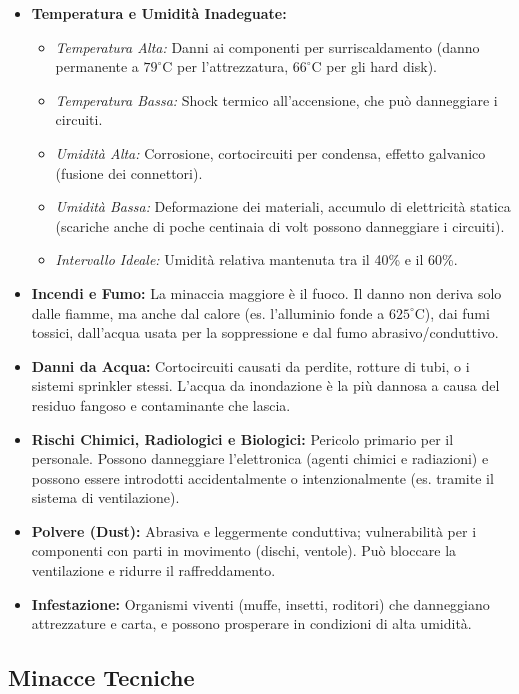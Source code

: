 \begin{itemize}
    \item \textbf{Temperatura e Umidità Inadeguate:}
    \begin{itemize}
        \item \textit{Temperatura Alta:} Danni ai componenti per surriscaldamento (danno permanente a $79^\circ$C per l'attrezzatura, $66^\circ$C per gli hard disk).
        \item \textit{Temperatura Bassa:} Shock termico all'accensione, che può danneggiare i circuiti.
        \item \textit{Umidità Alta:} Corrosione, cortocircuiti per condensa, effetto galvanico (fusione dei connettori).
        \item \textit{Umidità Bassa:} Deformazione dei materiali, accumulo di elettricità statica (scariche anche di poche centinaia di volt possono danneggiare i circuiti).
        \item \textit{Intervallo Ideale:} Umidità relativa mantenuta tra il 40\% e il 60\%.
    \end{itemize}
    \item \textbf{Incendi e Fumo:} La minaccia maggiore è il fuoco. Il danno non deriva solo dalle fiamme, ma anche dal calore (es. l'alluminio fonde a $625^\circ$C), dai fumi tossici, dall'acqua usata per la soppressione e dal fumo abrasivo/conduttivo.
    \item \textbf{Danni da Acqua:} Cortocircuiti causati da perdite, rotture di tubi, o i sistemi sprinkler stessi. L'acqua da inondazione è la più dannosa a causa del residuo fangoso e contaminante che lascia.
    \item \textbf{Rischi Chimici, Radiologici e Biologici:} Pericolo primario per il personale. Possono danneggiare l'elettronica (agenti chimici e radiazioni) e possono essere introdotti accidentalmente o intenzionalmente (es. tramite il sistema di ventilazione).
    \item \textbf{Polvere (Dust):} Abrasiva e leggermente conduttiva; vulnerabilità per i componenti con parti in movimento (dischi, ventole). Può bloccare la ventilazione e ridurre il raffreddamento.
    \item \textbf{Infestazione:} Organismi viventi (muffe, insetti, roditori) che danneggiano attrezzature e carta, e possono prosperare in condizioni di alta umidità.
\end{itemize}

\subsection{Minacce Tecniche}

